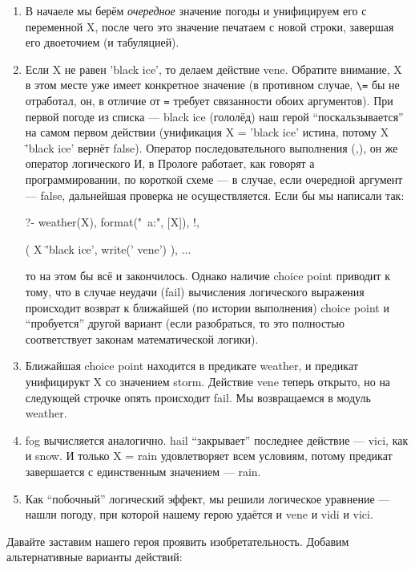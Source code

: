 \documentclass[a4paper]{book}
\begin{document}
\begin{enumerate}
\item В начаеле мы берём {\it очередное\/} значение погоды и
  унифицируем его с переменной X, после чего это значение
  печатаем с новой строки, завершая его двоеточием (и
  табуляцией).
\item Если X не равен 'black ice', то делаем действие
  vene. Обратите внимание, X в этом месте уже имеет конкретное
  значение (в противном случае, \verb|\=| бы не отработал, он, в
  отличие от \verb|=| требует связанности обоих аргументов). При
  первой погоде из списка --- black ice (гололёд) наш герой
  ``поскальзывается'' на самом первом действии (унификация X =
  'black ice' истина, потому X \= 'black ice' вернёт
  false). Оператор последовательного выполнения (,), он же
  оператор логического И, в Прологе работает, как говорят а
  программировании, по короткой схеме --- в случае, если
  очередной аргумент --- false, дальнейшая проверка не
  осуществляется. Если бы мы написали так:

  \begin{example}{}{}
?- weather(X), format("\n~a:", [X]), !,

   ( X \= 'black ice',     write(' vene') ), 
    ...
  \end{example}

  то на этом бы всё и закончилось. Однако наличие choice point
  приводит к тому, что в случае неудачи (fail) вычисления
  логического выражения происходит возврат к ближайшей (по
  истории выполнения) choice point и ``пробуется'' другой вариант
  (если разобраться, то это полностью соответствует законам
  математической логики).
\item Ближайшая choice point находится в предикате weather, и
  предикат унифицирукт X со значением storm. Действие vene теперь
  открыто, но на следующей строчке опять происходит fail. Мы
  возвращаемся в модуль weather.
\item fog вычисляется аналогично. hail ``закрывает'' последнее
  действие --- vici, как и snow. И только X = rain удовлетворяет
  всем условиям, потому предикат завершается с единственным
  значением --- rain. 
\item Как ``побочный'' логический эффект, мы решили логическое
  уравнение --- нашли погоду, при которой нашему герою удаётся и
  vene и vidi и vici.
\end{enumerate}

Давайте заставим нашего героя проявить изобретательность. Добавим
альтернативные варианты действий:
\end{document}
